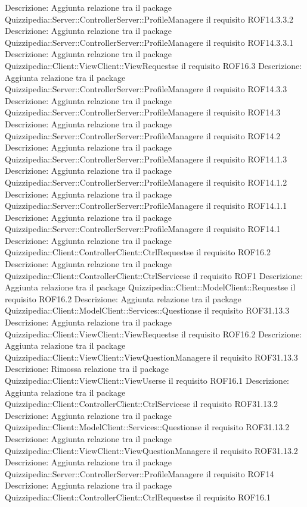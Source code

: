 Descrizione: Aggiunta relazione tra il package Quizzipedia::Server::ControllerServer::ProfileManagere il requisito ROF14.3.3.2 
Descrizione: Aggiunta relazione tra il package Quizzipedia::Server::ControllerServer::ProfileManagere il requisito ROF14.3.3.1 
Descrizione: Aggiunta relazione tra il package Quizzipedia::Client::ViewClient::ViewRequestse il requisito ROF16.3 
Descrizione: Aggiunta relazione tra il package Quizzipedia::Server::ControllerServer::ProfileManagere il requisito ROF14.3.3 
Descrizione: Aggiunta relazione tra il package Quizzipedia::Server::ControllerServer::ProfileManagere il requisito ROF14.3 
Descrizione: Aggiunta relazione tra il package Quizzipedia::Server::ControllerServer::ProfileManagere il requisito ROF14.2 
Descrizione: Aggiunta relazione tra il package Quizzipedia::Server::ControllerServer::ProfileManagere il requisito ROF14.1.3 
Descrizione: Aggiunta relazione tra il package Quizzipedia::Server::ControllerServer::ProfileManagere il requisito ROF14.1.2 
Descrizione: Aggiunta relazione tra il package Quizzipedia::Server::ControllerServer::ProfileManagere il requisito ROF14.1.1 
Descrizione: Aggiunta relazione tra il package Quizzipedia::Server::ControllerServer::ProfileManagere il requisito ROF14.1 
Descrizione: Aggiunta relazione tra il package Quizzipedia::Client::ControllerClient::CtrlRequestse il requisito ROF16.2 
Descrizione: Aggiunta relazione tra il package Quizzipedia::Client::ControllerClient::CtrlServicese il requisito ROF1 
Descrizione: Aggiunta relazione tra il package Quizzipedia::Client::ModelClient::Requestse il requisito ROF16.2 
Descrizione: Aggiunta relazione tra il package Quizzipedia::Client::ModelClient::Services::Questionse il requisito ROF31.13.3 
Descrizione: Aggiunta relazione tra il package Quizzipedia::Client::ViewClient::ViewRequestse il requisito ROF16.2 
Descrizione: Aggiunta relazione tra il package Quizzipedia::Client::ViewClient::ViewQuestionManagere il requisito ROF31.13.3 
Descrizione: Rimossa relazione tra il package Quizzipedia::Client::ViewClient::ViewUserse il requisito ROF16.1 
Descrizione: Aggiunta relazione tra il package Quizzipedia::Client::ControllerClient::CtrlServicese il requisito ROF31.13.2 
Descrizione: Aggiunta relazione tra il package Quizzipedia::Client::ModelClient::Services::Questionse il requisito ROF31.13.2 
Descrizione: Aggiunta relazione tra il package Quizzipedia::Client::ViewClient::ViewQuestionManagere il requisito ROF31.13.2 
Descrizione: Aggiunta relazione tra il package Quizzipedia::Server::ControllerServer::ProfileManagere il requisito ROF14 
Descrizione: Aggiunta relazione tra il package Quizzipedia::Client::ControllerClient::CtrlRequestse il requisito ROF16.1 

